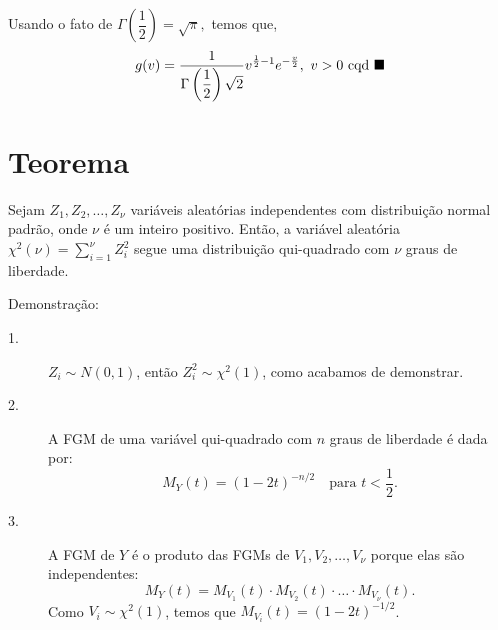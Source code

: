 \documentclass[12pt]{beamer}
\begin{document}
\begin{frame}{}
\begin{block}{}
\justifying
Usando o fato de $\Gamma\left(\dfrac{1}{2}\right)=\sqrt{\pi},$ temos que,
\begin{align*}
   g(v)=\dfrac{1}{\Gamma\left(\dfrac{1}{2}\right)\sqrt{2}}v^{\frac{1}{2}-1}e^{-\frac{v}{2}},~v>0~\text{cqd}~\blacksquare
\end{align*}

\end{block}
\end{frame}

\section{Teorema}
\begin{frame}{}
\begin{Teorema}
\justifying
Sejam $Z_1, Z_2, \ldots, Z_{\nu}$ variáveis aleatórias independentes com distribuição normal padrão, onde $\nu$ é um inteiro positivo. Então, a variável aleatória $\chi^2(\nu) = {\displaystyle \sum_{i=1}^{\nu}} Z_i^2$ segue uma distribuição qui-quadrado com $\nu$ graus de liberdade.

\end{Teorema}
\end{frame}

\begin{frame}{Demonstração:}
\begin{block}{}
\begin{description}
	\item[1.] \( Z_i \sim N(0,1) \), então \( Z_i^2 \sim \chi^2(1) \), como acabamos de demonstrar. \pause
	\item[2.] A FGM de uma variável qui-quadrado com \( n \) graus de liberdade é dada por:
	\[
	M_{Y}(t) = (1 - 2t)^{-n/2} \quad \text{para } t < \frac{1}{2}.
	\]\pause
	\item[3.] A FGM de \( Y \) é o produto das FGMs de \( V_1, V_2, \ldots, V_{\nu} \) porque elas são independentes:
	\[
	M_{Y}(t) = M_{V_1}(t) \cdot M_{V_2}(t) \cdot \ldots \cdot M_{V_{\nu}}(t).
	\]
    Como \( V_i \sim \chi^2(1) \), temos que \( M_{V_i}(t) = (1 - 2t)^{-1/2} \).
\end{description}
\end{block}

\end{frame}
\end{document}
